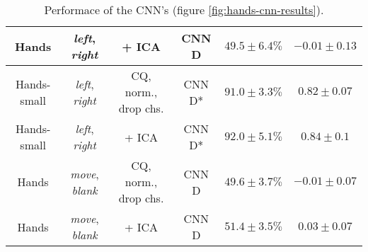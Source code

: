 \begin{table}[h]
{\begin{tabular}{c|c|c|c|c|c}
    \hline
    Hands               & \textit{left}, \textit{right}                 & + ICA                     & CNN D                 &  $49.5 \pm 6.4 \%$    & $-0.01 \pm 0.13$\\ 
    \hline
    Hands-small         & \textit{left}, \textit{right}                 & CQ, norm., drop chs.      & CNN D*                &  $91.0 \pm 3.3 \%$    & $0.82 \pm 0.07$\\  
    \hline
    Hands-small         & \textit{left}, \textit{right}                 & + ICA                     & CNN D*                &  $92.0 \pm 5.1 \%$    & $0.84 \pm 0.1$\\  
    \hline
    Hands               & \textit{move}, \textit{blank}                 & CQ, norm., drop chs.      & CNN D                 &  $49.6 \pm 3.7 \%$    & $-0.01 \pm 0.07$\\ 
    \hline
    Hands               & \textit{move}, \textit{blank}                 & + ICA                     & CNN D                 &  $51.4 \pm 3.5 \%$    & $0.03 \pm 0.07$\\  
    \hline
\end{tabular}
}
\caption{Performace of the CNN's (figure \ref{fig:hands-cnn-results}).}%
\label{tab:hands-cnn-app}
\end{table}